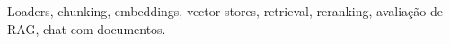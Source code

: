 
Loaders, chunking, embeddings, vector stores, retrieval, reranking, avaliação de RAG, chat com documentos.

